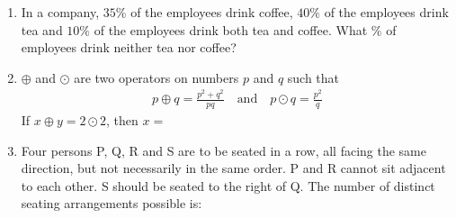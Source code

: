 \documentclass[journal,12pt,onecolumn]{article}
\theoremstyle{remark}
\begin{document}
\begin{enumerate}
\item In a company, $35\%$ of the employees drink coffee, $40\%$ of the employees drink tea and $10\%$ of the employees drink both tea and coffee. What $\%$ of employees drink neither tea nor coffee?

\hfill{}
\begin{enumerate}
\end{enumerate}

\item $\oplus$ and $\odot$ are two operators on numbers $p$ and $q$ such that
\begin{align}
p \oplus q = \frac{p^2+q^2}{pq} \quad \text{and} \quad p \odot q = \frac{p^2}{q}
\end{align}
If $x \oplus y = 2 \odot 2$, then $x =$

\hfill{}
\begin{enumerate}
\end{enumerate}

\item Four persons P, Q, R and S are to be seated in a row, all facing the same direction, but not necessarily in the same order. P and R cannot sit adjacent to each other. S should be seated to the right of Q. The number of distinct seating arrangements possible is:

\hfill{}
\begin{enumerate}
\end{enumerate}


\end{enumerate}
\end{document}
